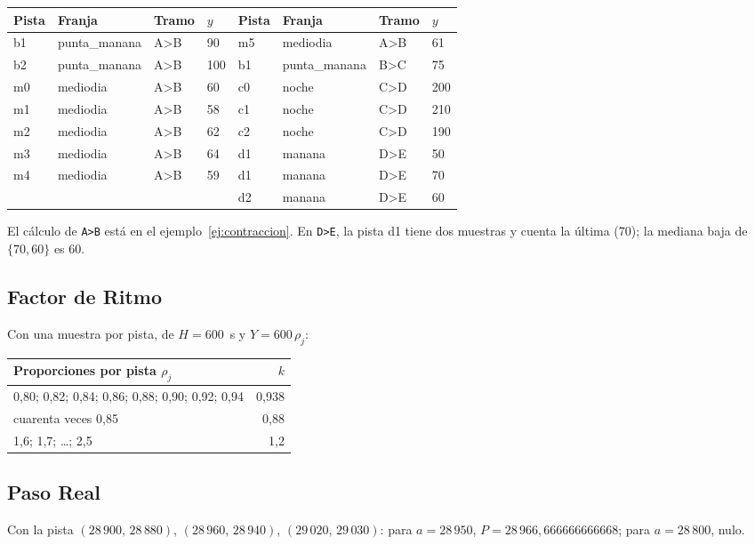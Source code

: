 \begin{center}
\small
\begin{tabular}{@{}llll@{\qquad}llll@{}}
\toprule
Pista & Franja & Tramo & $y$ & Pista & Franja & Tramo & $y$\\
\midrule
b1 & punta\_manana & A>B & 90 & m5 & mediodia & A>B & 61\\
b2 & punta\_manana & A>B & 100 & b1 & punta\_manana & B>C & 75\\
m0 & mediodia & A>B & 60 & c0 & noche & C>D & 200\\
m1 & mediodia & A>B & 58 & c1 & noche & C>D & 210\\
m2 & mediodia & A>B & 62 & c2 & noche & C>D & 190\\
m3 & mediodia & A>B & 64 & d1 & manana & D>E & 50\\
m4 & mediodia & A>B & 59 & d1 & manana & D>E & 70\\
 & & & & d2 & manana & D>E & 60\\
\bottomrule
\end{tabular}
\end{center}

\noindent El cálculo de \texttt{A>B} está en el ejemplo~\ref{ej:contraccion}. En \texttt{D>E}, la pista d1 tiene dos
muestras y cuenta la última (70); la mediana baja de $\{70,60\}$ es 60.

\subsection{Factor de Ritmo} Con una muestra por pista, de $H=600$~s y $Y=600\,\rho_j$:

\begin{center}
\small
\begin{tabular}{@{}lr@{}}
\toprule
Proporciones por pista $\rho_j$ & $k$\\
\midrule
0,80; 0,82; 0,84; 0,86; 0,88; 0,90; 0,92; 0,94 & 0,938\\
cuarenta veces 0,85 & 0,88\\
1,6; 1,7; \dots; 2,5 & 1,2\\
\bottomrule
\end{tabular}
\end{center}

\subsection{Paso Real} Con la pista $(28\,900,\,28\,880)$, $(28\,960,\,28\,940)$, $(29\,020,\,29\,030)$: para
$a=28\,950$, $P=28\,966{,}666666666668$; para $a=28\,800$, nulo.

